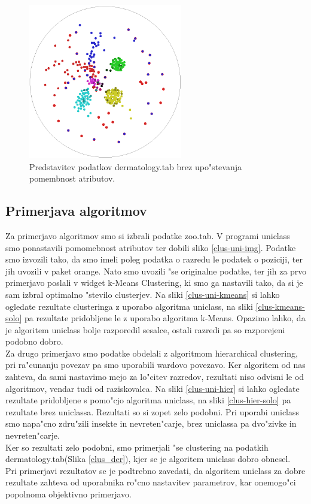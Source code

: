 \documentclass[a4paper]{article}
\begin{document}
	\begin{figure}[H]
	\begin{center}
	\includegraphics[width=0.6\textwidth]{img/der_uniclass_2.png}
	\end{center}
	\caption{Predstavitev podatkov dermatology.tab brez upo"stevanja pomembnost atributov.}
	\label{f-der-2}
	\end{figure}

	\subsection{Primerjava algoritmov}
		Za primerjavo algoritmov smo si izbrali podatke zoo.tab. V programi uniclass smo ponastavili pomomebnost atributov ter dobili sliko \ref{clus-uni-img}. Podatke smo izvozili tako, da smo imeli poleg podatka o razredu le podatek o poziciji, ter jih uvozili v paket orange. Nato smo uvozili "se originalne podatke, ter jih za prvo primerjavo poslali v widget k-Means Clustering, ki smo ga nastavili tako, da si je sam izbral optimalno "stevilo clusterjev. Na sliki \ref{clus-uni-kmeans} si lahko ogledate rezultate clusteringa z uporabo algoritma uniclass, na sliki \ref{clus-kmeans-solo} pa rezultate pridobljene le z uporabo algoritma k-Means. Opazimo lahko, da je algoritem uniclass bolje razporedil sesalce, ostali razredi pa so razporejeni podobno dobro.\\
		Za drugo primerjavo smo podatke obdelali z algoritmom hierarchical clustering, pri ra"cunanju povezav pa smo uporabili wardovo povezavo. Ker algoritem od nas zahteva, da sami nastavimo mejo za lo"citev razredov, rezultati niso odvisni le od algoritmov, vendar tudi od raziskovalca. Na sliki \ref{clus-uni-hier} si lahko ogledate rezultate pridobljene s pomo"cjo algoritma uniclass, na sliki \ref{clus-hier-solo} pa rezultate brez uniclassa. Rezultati so si zopet zelo podobni. Pri uporabi uniclass smo napa"cno zdru"zili insekte in nevreten"carje, brez uniclassa pa dvo"zivke in nevreten"carje. \\
		Ker so rezultati zelo podobni, smo primerjali "se clustering na podatkih dermatology.tab(Slika \ref{clus_der}), kjer se je algoritem uniclass dobro obnesel. \\
		Pri primerjavi rezultatov se je podtrebno zavedati, da algoritem uniclass za dobre rezultate zahteva od uporabnika ro"cno nastavitev parametrov, kar onemogo"ci popolnoma objektivno primerjavo. 
\end{document}
